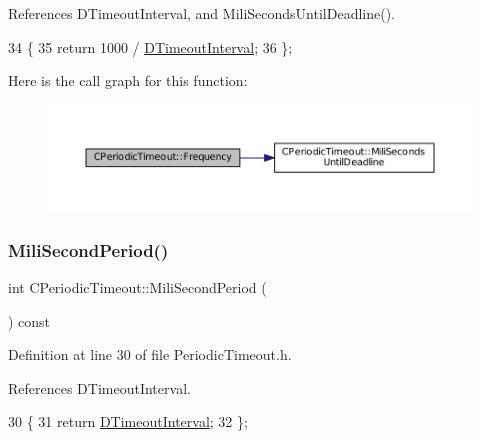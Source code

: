 References D\+Timeout\+Interval, and Mili\+Seconds\+Until\+Deadline().


\begin{DoxyCode}
34                              \{
35             \textcolor{keywordflow}{return} 1000 / \hyperlink{classCPeriodicTimeout_ab0c2b821c02366c9638a66eced3c1f34}{DTimeoutInterval};  
36         \};
\end{DoxyCode}
Here is the call graph for this function\+:\nopagebreak
\begin{figure}[H]
\begin{center}
\leavevmode
\includegraphics[width=350pt]{classCPeriodicTimeout_af5a198bf926337b0f4470d0b77bca542_cgraph}
\end{center}
\end{figure}
\hypertarget{classCPeriodicTimeout_ad5e27bd939d6452b0667d0c5ef74247e}{}\label{classCPeriodicTimeout_ad5e27bd939d6452b0667d0c5ef74247e} 
\subsubsection{\texorpdfstring{Mili\+Second\+Period()}{MiliSecondPeriod()}}
{\footnotesize\ttfamily int C\+Periodic\+Timeout\+::\+Mili\+Second\+Period (\begin{DoxyParamCaption}{ }\end{DoxyParamCaption}) const\hspace{0.3cm}{\ttfamily [inline]}}



Definition at line 30 of file Periodic\+Timeout.\+h.



References D\+Timeout\+Interval.


\begin{DoxyCode}
30                                     \{
31             \textcolor{keywordflow}{return} \hyperlink{classCPeriodicTimeout_ab0c2b821c02366c9638a66eced3c1f34}{DTimeoutInterval}; 
32         \};
\end{DoxyCode}
\hypertarget{classCPeriodicTimeout_a5d32d0a29ba5efa718f3489cb9fb2340}{}\label{classCPeriodicTimeout_a5d32d0a29ba5efa718f3489cb9fb2340} 
